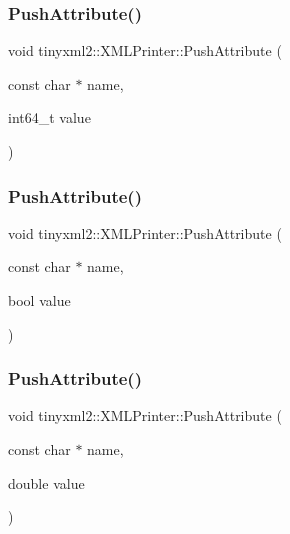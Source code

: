 \subsubsection{\texorpdfstring{Push\+Attribute()}{PushAttribute()}\hspace{0.1cm}{\footnotesize\ttfamily [4/6]}}
{\footnotesize\ttfamily void tinyxml2\+::\+X\+M\+L\+Printer\+::\+Push\+Attribute (\begin{DoxyParamCaption}\item[{const char $\ast$}]{name,  }\item[{int64\+\_\+t}]{value }\end{DoxyParamCaption})}

\mbox{\label{classtinyxml2_1_1_x_m_l_printer_a51f7950d7b7a19f0d3a0d549a318d45f}} 
\subsubsection{\texorpdfstring{Push\+Attribute()}{PushAttribute()}\hspace{0.1cm}{\footnotesize\ttfamily [5/6]}}
{\footnotesize\ttfamily void tinyxml2\+::\+X\+M\+L\+Printer\+::\+Push\+Attribute (\begin{DoxyParamCaption}\item[{const char $\ast$}]{name,  }\item[{bool}]{value }\end{DoxyParamCaption})}

\mbox{\label{classtinyxml2_1_1_x_m_l_printer_a1714867af40e68ca404c3e84b6cac2a6}} 
\subsubsection{\texorpdfstring{Push\+Attribute()}{PushAttribute()}\hspace{0.1cm}{\footnotesize\ttfamily [6/6]}}
{\footnotesize\ttfamily void tinyxml2\+::\+X\+M\+L\+Printer\+::\+Push\+Attribute (\begin{DoxyParamCaption}\item[{const char $\ast$}]{name,  }\item[{double}]{value }\end{DoxyParamCaption})}

